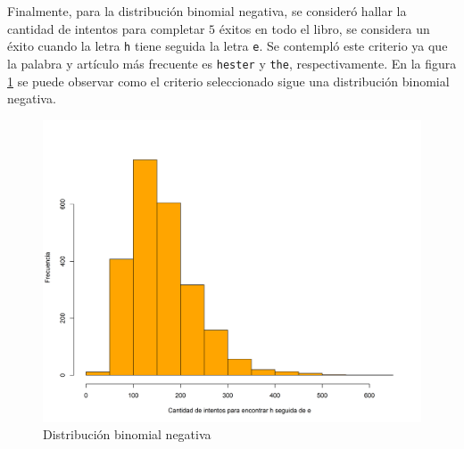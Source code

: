 \documentclass{article}
\begin{document}
Finalmente, para la distribución binomial negativa, se consideró hallar la cantidad de intentos para completar $5$ éxitos en todo el libro, se considera un éxito cuando la letra \texttt{h} tiene seguida la letra \texttt{e}. Se contempló este criterio ya que la palabra y artículo más frecuente es \texttt{hester} y \texttt{the}, respectivamente. En la figura \ref{he} se puede observar como el criterio seleccionado sigue una distribución binomial negativa.


\begin{figure}
\centering
\includegraphics[scale=0.5]{Figures/he.png}
\caption{Distribución binomial negativa}
\label{he}
\end{figure}




\end{document}

